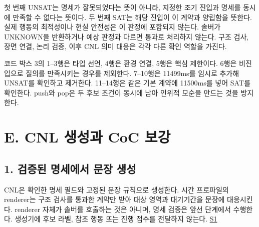 \documentclass[11pt,a4paper]{article}
\begin{document}
첫 번째 UNSAT는 명세가 잘못되었다는 뜻이 아니라, 지정한 조기 진입과 명세를 동시에 만족할 수 없다는 뜻이다. 두 번째 SAT는 해당 진입이 이 계약과 양립함을 뜻한다. 실제 행동의 최적성이나 현실 안전성은 이 판정에 포함되지 않는다. 솔버가 UNKNOWN을 반환하거나 예상 판정과 다르면 통과로 처리하지 않는다. 구조 검사, 장면 연결, 논리 검증, 이후 CNL 의미 대응은 각각 다른 확인 역할을 가진다.\par

코드 박스 3의 1–3행은 타입 선언, 4행은 환경 연결, 5행은 핵심 제한이다. 6행은 비진입으로 질의를 만족시키는 경우를 제외한다. 7–10행은 11499ms를 임시로 추가해 UNSAT를 확인하고 제거한다. 11–14행은 같은 기본 계약에 11500ms를 넣어 SAT를 확인한다. {\ttfamily\small push}와 {\ttfamily\small pop}은 두 후보 조건이 동시에 남아 인위적 모순을 만드는 것을 방지한다.\par

\section*{E. CNL 생성과 CoC 보강}

\subsection*{1. 검증된 명세에서 문장 생성}

CNL은 확인한 명세 필드와 고정된 문장 규칙으로 생성한다. 시간 프로파일의 renderer는 구조 검사를 통과한 계약만 받아 대상 영역과 대기기간을 문장에 대응시킨다. renderer 자체가 솔버를 호출하는 것은 아니며, 명세 검증은 앞선 단계에서 수행한다. 생성기에 후보 라벨, 참조 행동 또는 진행 점수를 전달하지 않는다. \href{\detokenize{../../../../../../projects/04-guardsynth-coc/experiments/paper1_cnl_learning/temporal_preservation.py}}{S1}\par
\end{document}
